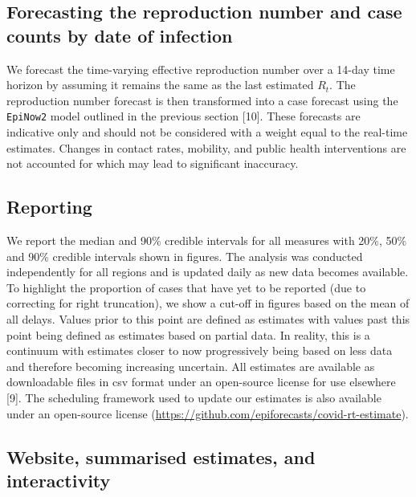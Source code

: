\documentclass[
]{article}
\begin{document}
\hypertarget{forecasting-the-reproduction-number-and-case-counts-by-date-of-infection}{%
\subsection{Forecasting the reproduction number and case counts by date
of
infection}\label{forecasting-the-reproduction-number-and-case-counts-by-date-of-infection}}

We forecast the time-varying effective reproduction number over a 14-day
time horizon by assuming it remains the same as the last estimated
\(R_t\). The reproduction number forecast is then transformed into a
case forecast using the \texttt{EpiNow2} model outlined in the previous
section {[}10{]}. These forecasts are indicative only and should not be
considered with a weight equal to the real-time estimates. Changes in
contact rates, mobility, and public health interventions are not
accounted for which may lead to significant inaccuracy.

\hypertarget{reporting}{%
\subsection{Reporting}\label{reporting}}

We report the median and 90\% credible intervals for all measures with
20\%, 50\% and 90\% credible intervals shown in figures. The analysis
was conducted independently for all regions and is updated daily as new
data becomes available. To highlight the proportion of cases that have
yet to be reported (due to correcting for right truncation), we show a
cut-off in figures based on the mean of all delays. Values prior to this
point are defined as estimates with values past this point being defined
as estimates based on partial data. In reality, this is a continuum with
estimates closer to now progressively being based on less data and
therefore becoming increasing uncertain. All estimates are available as
downloadable files in csv format under an open-source license for use
elsewhere {[}9{]}. The scheduling framework used to update our estimates
is also available under an open-source license
(\url{https://github.com/epiforecasts/covid-rt-estimate}).

\hypertarget{website-summarised-estimates-and-interactivity}{%
\subsection{Website, summarised estimates, and
interactivity}\label{website-summarised-estimates-and-interactivity}}
\end{document}
